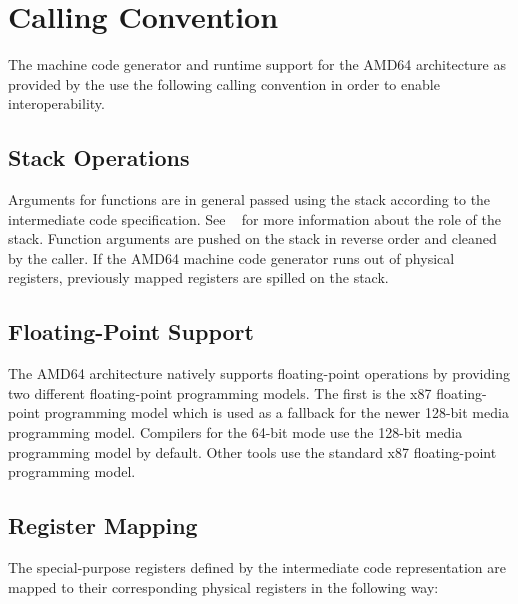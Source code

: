 \section{Calling Convention}

The machine code generator and runtime support for the AMD64 architecture as provided by the \ecs{} use the following calling convention in order to enable interoperability.

\subsection{Stack Operations}

Arguments for functions are in general passed using the stack according to the intermediate code specification.
See \Documentation{}~ for more information about the role of the stack.
Function arguments are pushed on the stack in reverse order and cleaned by the caller.
If the AMD64 machine code generator runs out of physical registers, previously mapped registers are spilled on the stack.

\subsection{Floating-Point Support}

The AMD64 architecture natively supports floating-point operations by providing two different floating-point programming models.
The first is the x87 floating-point programming model which is used as a fallback for the newer 128-bit media programming model.
Compilers for the 64-bit mode use the 128-bit media programming model by default.
Other tools use the standard x87 floating-point programming model.

\subsection{Register Mapping}

The special-purpose registers defined by the intermediate code representation are mapped to their corresponding physical registers in the following way:


